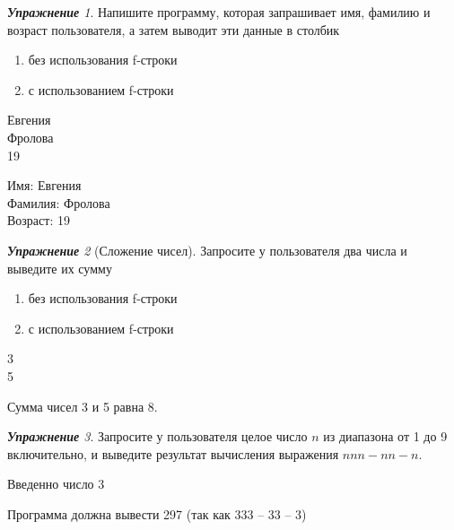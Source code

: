 \documentclass[a4,12pt]{article}
\theoremstyle{remark}
\newtheorem{exercise}{\textbf{Упражнение}}[section]
\begin{document}
\begin{exercise}
Напишите программу, которая запрашивает имя, фамилию и возраст пользователя, а затем выводит эти данные в столбик %
\begin{enumerate}[label=\textbf{\alph*)}]
    \item без использования f-строки
    \item с использованием f-строки
\end{enumerate}

\begin{inputformat}
Евгения\\
Фролова\\
19
\end{inputformat}
    
\begin{outputformat}
Имя: Евгения\\
Фамилия: Фролова\\
Возраст: 19
\end{outputformat}

\end{exercise}

\begin{exercise}[Сложение чисел]
Запросите у пользователя два числа и выведите их сумму
\begin{enumerate}[label=\textbf{\alph*)}]
    \item без использования f-строки
    \item с использованием f-строки
\end{enumerate}
\begin{inputformat}
3\\
5
\end{inputformat}
    
\begin{outputformat}
Сумма чисел 3 и 5 равна 8.
\end{outputformat}
\end{exercise}

\begin{exercise}
Запросите у пользователя целое число $n$ из диапазона от 1 до 9 включительно, и выведите результат вычисления выражения $nnn - nn - n$. %

\begin{inputformat}
Введенно число 3
\end{inputformat}
    
\begin{outputformat}
Программа должна вывести 297 (так как 333 – 33 – 3)
\end{outputformat}

\end{exercise}
\end{document}
